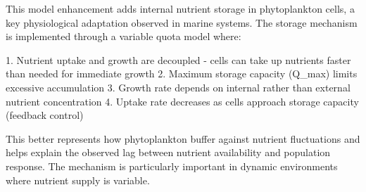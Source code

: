 This model enhancement adds internal nutrient storage in phytoplankton cells, a key physiological adaptation observed in marine systems. The storage mechanism is implemented through a variable quota model where:

1. Nutrient uptake and growth are decoupled - cells can take up nutrients faster than needed for immediate growth
2. Maximum storage capacity (Q_max) limits excessive accumulation
3. Growth rate depends on internal rather than external nutrient concentration
4. Uptake rate decreases as cells approach storage capacity (feedback control)

This better represents how phytoplankton buffer against nutrient fluctuations and helps explain the observed lag between nutrient availability and population response. The mechanism is particularly important in dynamic environments where nutrient supply is variable.

